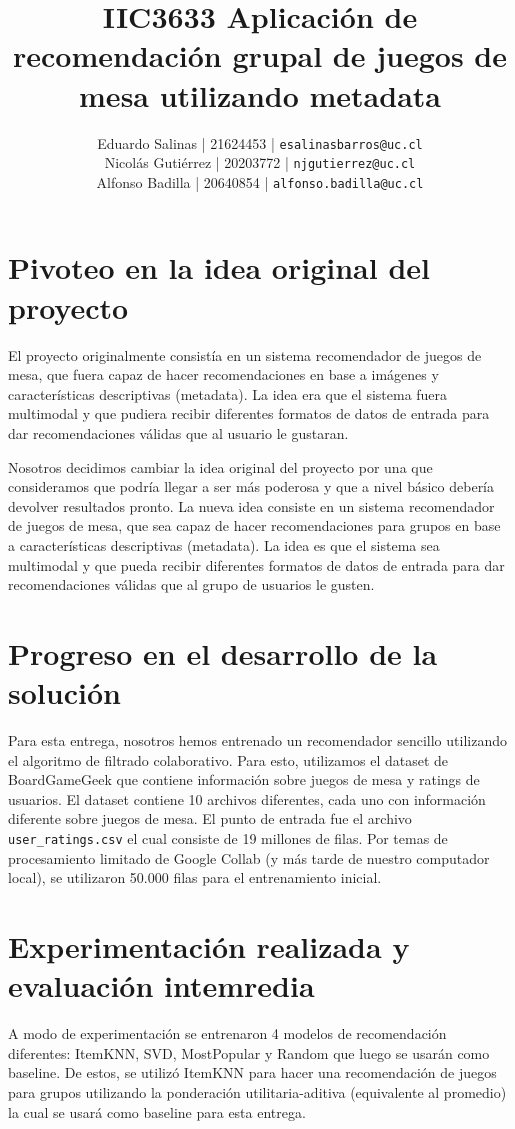 \documentclass[11pt]{article}
\title{IIC3633 Aplicación de recomendación grupal de juegos de mesa utilizando metadata}
\author{\normalfont 
Eduardo Salinas | 21624453 | \texttt{esalinasbarros@uc.cl} \\
Nicolás Gutiérrez | 20203772 | \texttt{njgutierrez@uc.cl} \\
Alfonso Badilla | 20640854 | \texttt{alfonso.badilla@uc.cl} \\
}
\begin{document}
\maketitle
\newpage

\section{Pivoteo en la idea original del proyecto}

El proyecto originalmente consistía en un sistema recomendador de juegos de mesa, que fuera capaz de hacer recomendaciones en base a imágenes y características descriptivas (metadata). La idea era que el sistema fuera multimodal y que pudiera recibir diferentes formatos de datos de entrada para dar recomendaciones válidas que al usuario le gustaran. 

Nosotros decidimos cambiar la idea original del proyecto por una que consideramos que podría llegar a ser más poderosa y que a nivel básico debería devolver resultados pronto. La nueva idea consiste en un sistema recomendador de juegos de mesa, que sea capaz de hacer recomendaciones para grupos en base a características descriptivas (metadata). La idea es que el sistema sea multimodal y que pueda recibir diferentes formatos de datos de entrada para dar recomendaciones válidas que al grupo de usuarios le gusten.


\section{Progreso en el desarrollo de la solución}

Para esta entrega, nosotros hemos entrenado un recomendador sencillo utilizando el algoritmo de filtrado colaborativo. Para esto, utilizamos el dataset de BoardGameGeek que contiene información sobre juegos de mesa y ratings de usuarios. El dataset contiene 10 archivos diferentes, cada uno con información diferente sobre juegos de mesa. El punto de entrada fue el archivo \texttt{user\_ratings.csv} el cual consiste de 19 millones de filas. Por temas de procesamiento limitado de Google Collab (y más tarde de nuestro computador local), se utilizaron 50.000 filas para el entrenamiento inicial.


\section{Experimentación realizada y evaluación intemredia}
A modo de experimentación se entrenaron 4 modelos de recomendación diferentes: ItemKNN, SVD, MostPopular y Random que luego se usarán como baseline. De estos, se utilizó ItemKNN para hacer una recomendación de juegos para grupos utilizando la ponderación utilitaria-aditiva (equivalente al promedio) la cual se usará como baseline para esta entrega. 
\end{document}
